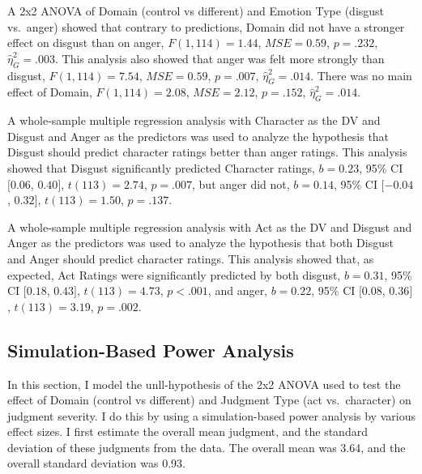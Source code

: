 \documentclass[man]{apa6}
\begin{document}
A 2x2 ANOVA of Domain (control vs different) and Emotion Type (disgust
vs.~anger) showed that contrary to predictions, Domain did not have a
stronger effect on disgust than on anger, \(F(1, 114) = 1.44\),
\(\mathit{MSE} = 0.59\), \(p = .232\), \(\hat{\eta}^2_G = .003\). This
analysis also showed that anger was felt more strongly than disgust,
\(F(1, 114) = 7.54\), \(\mathit{MSE} = 0.59\), \(p = .007\),
\(\hat{\eta}^2_G = .014\). There was no main effect of Domain,
\(F(1, 114) = 2.08\), \(\mathit{MSE} = 2.12\), \(p = .152\),
\(\hat{\eta}^2_G = .014\).

A whole-sample multiple regression analysis with Character as the DV and
Disgust and Anger as the predictors was used to analyze the hypothesis
that Disgust should predict character ratings better than anger ratings.
This analysis showed that Disgust significantly predicted Character
ratings, \(b = 0.23\), 95\% CI \([0.06\), \(0.40]\), \(t(113) = 2.74\),
\(p = .007\), but anger did not, \(b = 0.14\), 95\% CI \([-0.04\),
\(0.32]\), \(t(113) = 1.50\), \(p = .137\).

A whole-sample multiple regression analysis with Act as the DV and
Disgust and Anger as the predictors was used to analyze the hypothesis
that both Disgust and Anger should predict character ratings. This
analysis showed that, as expected, Act Ratings were significantly
predicted by both disgust, \(b = 0.31\), 95\% CI \([0.18\), \(0.43]\),
\(t(113) = 4.73\), \(p < .001\), and anger, \(b = 0.22\), 95\% CI
\([0.08\), \(0.36]\), \(t(113) = 3.19\), \(p = .002\).

\subsection{Simulation-Based Power
Analysis}\label{simulation-based-power-analysis}

In this section, I model the unll-hypothesis of the 2x2 ANOVA used to
test the effect of Domain (control vs different) and Judgment Type (act
vs.~character) on judgment severity. I do this by using a
simulation-based power analysis by various effect sizes. I first
estimate the overall mean judgment, and the standard deviation of these
judgments from the data. The overall mean was 3.64, and the overall
standard deviation was 0.93.
\end{document}
